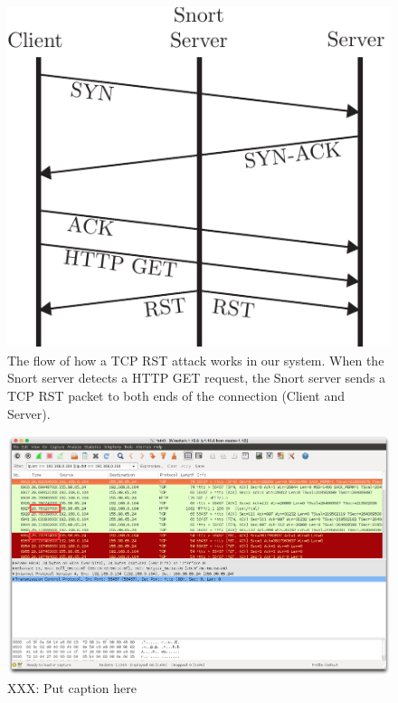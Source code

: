 \begin{figure}[!t]
    \centering
    \includegraphics[width=.8\columnwidth]{figures/tcp_reset}
    \caption{The flow of how a TCP RST attack works in our system. When the
    Snort server detects a HTTP GET request, the Snort server sends a TCP RST
    packet to both ends of the connection (Client and Server).}
    \label{fig:tcp_reset}
\end{figure}

\begin{figure}[!t]
    \centering
    \includegraphics[width=\columnwidth]{figures/snort_slow}
    \caption{XXX: Put caption here}
    \label{fig:snort_slow}
\end{figure}
